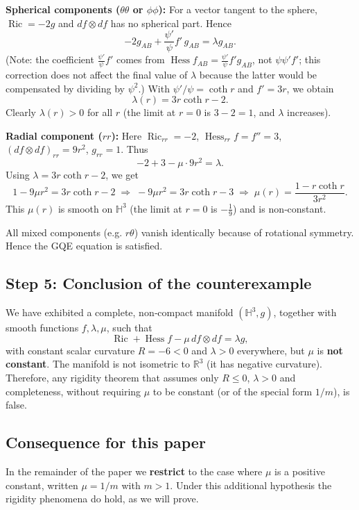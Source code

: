 \documentclass[12pt,a4paper]{article}
\newcommand{\Ric}{\operatorname{Ric}}
\newcommand{\Hess}{\operatorname{Hess}}
\theoremstyle{definition}
\theoremstyle{definition}
\begin{document}
\textbf{Spherical components ($\theta\theta$ or $\phi\phi$):}
For a vector tangent to the sphere, $\Ric = -2g$ and $df\otimes df$ has no spherical part.
Hence
\[
-2g_{AB} + \frac{\psi'}{\psi}f'\,g_{AB} = \lambda g_{AB}.
\]
(Note: the coefficient $\frac{\psi'}{\psi}f'$ comes from $\Hess f_{AB} = \frac{\psi'}{\psi}f' g_{AB}$, not $\psi\psi'f'$; this correction does not affect the final value of $\lambda$ because the latter would be compensated by dividing by $\psi^2$.)
With $\psi'/\psi = \coth r$ and $f'=3r$, we obtain
\[
\lambda(r) = 3r\coth r - 2.
\]
Clearly $\lambda(r)>0$ for all $r$ (the limit at $r=0$ is $3-2=1$, and $\lambda$ increases).

\textbf{Radial component ($rr$):}
Here $\Ric_{rr}=-2$, $\Hess_{rr}f = f''=3$, $(df\otimes df)_{rr}=9r^{2}$, $g_{rr}=1$.
Thus
\[
-2 + 3 - \mu\cdot 9r^{2} = \lambda.
\]
Using $\lambda = 3r\coth r -2$, we get
\[
1 - 9\mu r^{2} = 3r\coth r -2
\;\Longrightarrow\;
-9\mu r^{2} = 3r\coth r -3
\;\Longrightarrow\;
\mu(r) = \frac{1 - r\coth r}{3r^{2}}.
\]
This $\mu(r)$ is smooth on $\mathbb{H}^{3}$ (the limit at $r=0$ is $-\frac{1}{9}$) and is non‑constant.

All mixed components (e.g. $r\theta$) vanish identically because of rotational symmetry.
Hence the GQE equation is satisfied.

\subsection*{Step 5: Conclusion of the counterexample}
We have exhibited a complete, non‑compact manifold $(\mathbb{H}^{3},g)$,
together with smooth functions $f,\lambda,\mu$, such that
\[
\Ric + \Hess f - \mu\, df\otimes df = \lambda g,
\]
with constant scalar curvature $R=-6<0$ and $\lambda>0$ everywhere,
but $\mu$ is \textbf{not constant}.  The manifold is not isometric to
$\mathbb{R}^{3}$ (it has negative curvature).  Therefore, any rigidity
theorem that assumes only $R\le0$, $\lambda>0$ and completeness, without
requiring $\mu$ to be constant (or of the special form $1/m$), is false.

\subsection*{Consequence for this paper}
In the remainder of the paper we \textbf{restrict} to the case where $\mu$ is
a positive constant, written $\mu = 1/m$ with $m>1$.  Under this additional
hypothesis the rigidity phenomena do hold, as we will prove.
\end{document}
